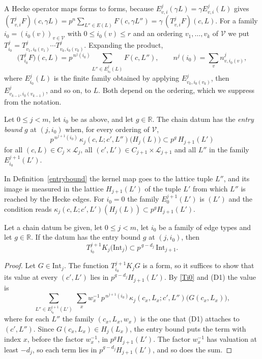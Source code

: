 A Hecke operator maps forms to forms, because $E^j_{v,i}(\gamma L)=\gamma E^j_{v,i}(L)$ gives $(T^j_{v,i}F)(c,\gamma L)=p^{n}\sum_{L''\in E(L)}F(c,\gamma L'')=\gamma\,(T^j_{v,i}F)(c,L)$. For a family $i_0=(i_0(v))_{v\in\mathcal V}$ with $0\le i_0(v)\le r$ and an ordering $v_1,\dots,v_k$ of $\mathcal V$ we put $T^j_{i_0}=T^j_{v_1,i_0(v_1)}\cdots T^j_{v_k,i_0(v_k)}$. Expanding the product,
\begin{equation}\label{Ti0}
\big(T^j_{i_0}F\big)(c,L)=p^{\,n^j(i_0)}\sum_{L''\in E^j_{i_0}(L)}F(c,L''),\qquad n^j(i_0)=\sum_vn^j_{v,i_0(v)},
\end{equation}
where $E^j_{i_0}(L)$ is the finite family obtained by applying $E^j_{v_k,i_0(v_k)}$, then $E^j_{v_{k-1},i_0(v_{k-1})}$, and so on, to $L$. Both depend on the ordering, which we suppress from the notation.

\begin{definition}\label{entrybound}
Let $0\le j<m$, let $i_0$ be as above, and let $g\in\mathbb R$. The chain datum has the \emph{entry bound} $g$ at $(j,i_0)$ when, for every ordering of $\mathcal V$,
\[
p^{\,n^{j+1}(i_0)}\,\kappa_j(c,L;c',L'')\big(H_j(L)\big)\subset p^g\,H_{j+1}(L')
\]
for all $(c,L)\in C_j\times\mathcal L_j$, all $(c',L')\in C_{j+1}\times\mathcal L_{j+1}$ and all $L''$ in the family $E^{j+1}_{i_0}(L')$.
\end{definition}

In Definition~\ref{entrybound} the kernel map goes to the lattice tuple $L''$, and its image is measured in the lattice $H_{j+1}(L')$ of the tuple $L'$ from which $L''$ is reached by the Hecke edges. For $i_0=0$ the family $E^{j+1}_0(L')$ is $(L')$ and the condition reads $\kappa_j(c,L;c',L')(H_j(L))\subset p^gH_{j+1}(L')$.

\begin{proposition}\label{formB}
Let a chain datum be given, let $0\le j<m$, let $i_0$ be a family of edge types and let $g\in\mathbb R$. If the datum has the entry bound $g$ at $(j,i_0)$, then
\[
T^{j+1}_{i_0}K_j\big(\mathrm{Int}_j\big)\subset p^{\,g-d_j}\,\mathrm{Int}_{j+1}.
\]
\end{proposition}

\begin{proof}
Let $G\in\mathrm{Int}_j$. The function $T^{j+1}_{i_0}K_jG$ is a form, so it suffices to show that its value at every $(c',L')$ lies in $p^{g-d_j}H_{j+1}(L')$. By \eqref{Ti0} and (D1) the value is
\[
\sum_{L''\in E^{j+1}_{i_0}(L')}\ \sum_xw_x^{-1}\,p^{\,n^{j+1}(i_0)}\kappa_j(c_x,L_x;c',L'')\big(G(c_x,L_x)\big),
\]
where for each $L''$ the family $(c_x,L_x,w_x)$ is the one that (D1) attaches to $(c',L'')$. Since $G(c_x,L_x)\in H_j(L_x)$, the entry bound puts the term with index $x$, before the factor $w_x^{-1}$, in $p^gH_{j+1}(L')$. The factor $w_x^{-1}$ has valuation at least $-d_j$, so each term lies in $p^{g-d_j}H_{j+1}(L')$, and so does the sum.
\end{proof}

